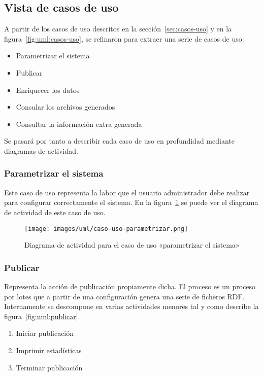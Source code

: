 
\subsection{Vista de casos de uso}

A partir de los casos de uso descritos en la sección~\ref{sec:casos-uso} y 
en la figura~\ref{fig:uml:casos-uso}, se refinaron para extraer una serie 
de casos de uso:

\begin{itemize}
 \item Parametrizar el sistema
 \item Publicar
 \item Enriquecer los datos
 \item Consular los archivos generados
 \item Consultar la información extra generada
\end{itemize}

Se pasará por tanto a describir cada caso de uso en profundidad mediante diagramas
de actividad.

\subsubsection{Parametrizar el sistema}

Este caso de uso representa la labor que el usuario administrador debe realizar 
para configurar correctamente el sistema. En la figura~\ref{fig:uml:parametrizar-sistema}
se puede ver el diagrama de actividad de este caso de uso.

\begin{figure}[H]
 	\centering
	\texttt{[image: images/uml/caso-uso-parametrizar.png]}
	\caption{Diagrama de actividad para el caso de uso «parametrizar el sistema»}
	\label{fig:uml:parametrizar-sistema}
\end{figure}

\subsubsection{Publicar}

Representa la acción de publicación propiamente dicha. El proceso es un proceso por 
lotes que a partir de una configuración genera una serie de ficheros RDF. Internamente
se descompone en varias actividades menores tal y como describe la 
figura~\ref{fig:uml:publicar}.

\begin{enumerate}
 \item Iniciar publicación
 \item Imprimir estadísticas
 \item Terminar publicación
\end{enumerate}


